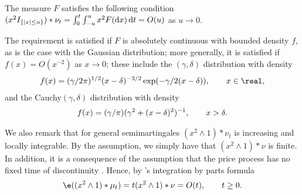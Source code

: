 \begin{ass} \label{as:nu}
  \mbox{}
  The \levy measure $F$ satisfies the following condition
  $(x^2I_{\{\vert x \vert \le u\}})\ast \nu_t = \int_0^t \int_{-u}^{u} x^2 F( \D x) \D t = O(u)$ as $u \to 0$.
\end{ass}
\begin{remark}

  The  requirement  is satisfied if $F$ is absolutely continuous with bounded density $f$, as is the case with the Gaussian distribution; more generally, it is satisfied  if  $f(x) = O(x^{-2})$ as $x \to 0$; these include the \levy$(\gamma, \delta)$ distribution with density 
  \begin{align}
    f(x) = (\gamma/2 \pi)^{1/2} (x - \delta)^{-3/2} \exp(-\gamma/ 2(x - \delta)),  \qquad x \in \real, \notag
    \label{}
  \end{align}
  and the Cauchy$(\gamma, \delta)$ distribution with density
  \begin{align}
    f(x) = (\gamma/\pi) (\gamma^2 + (x - \delta)^2)^{-1}, \qquad x > \delta.\notag
    \label{}
  \end{align}

  We also remark that for general semimartingales $(x^2 \wedge 1)\ast  \nu_t$ is increasing and locally integrable. By the \levy assumption, we simply have that  $(x^2 \wedge 1) *  \nu$ is finite. In addition, it is a consequence of the \levy assumption that the price process has no fixed time of discontinuity \citep[II.4.3]{Jacod2003}. Hence, by \ito's integration by parts formula 
  \begin{align}
    \e((x^2\wedge 1)\ast \mu_t) = t(x^2 \wedge 1) *  \nu = O(t), \qquad t \ge 0. \label{eq:secmo}
  \end{align}
\end{remark}
